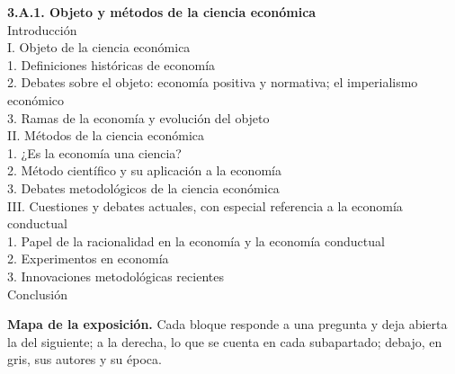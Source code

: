 \documentclass[11pt]{article}
\begin{document}
\begin{esquema}[unbreakable]
\textbf{3.A.1. Objeto y métodos de la ciencia económica}\\[2pt]
Introducción\\
I. Objeto de la ciencia económica\\
\hspace*{1.5em}1. Definiciones históricas de economía\\
\hspace*{1.5em}2. Debates sobre el objeto: economía positiva y normativa; el imperialismo económico\\
\hspace*{1.5em}3. Ramas de la economía y evolución del objeto\\
II. Métodos de la ciencia económica\\
\hspace*{1.5em}1. ¿Es la economía una ciencia?\\
\hspace*{1.5em}2. Método científico y su aplicación a la economía\\
\hspace*{1.5em}3. Debates metodológicos de la ciencia económica\\
III. Cuestiones y debates actuales, con especial referencia a la economía conductual\\
\hspace*{1.5em}1. Papel de la racionalidad en la economía y la economía conductual\\
\hspace*{1.5em}2. Experimentos en economía\\
\hspace*{1.5em}3. Innovaciones metodológicas recientes\\
Conclusión
\end{esquema}

\begin{anotaciones}
\textbf{Mapa de la exposición.} Cada bloque responde a una pregunta y deja abierta la del siguiente; a la derecha, lo que se cuenta en cada subapartado; debajo, en gris, sus autores y su época.
\begin{infografiacaja}
\caption{Mapa del tema: la pregunta de cada bloque, sus subapartados y el hilo que los une}\label{figu:mapa-tema}
\end{infografiacaja}
\end{anotaciones}
\end{document}
